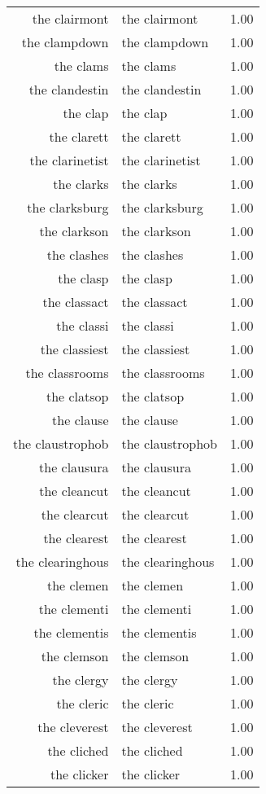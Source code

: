 \begin{table}[ht]
\begin{tabular}{rlr}
  the clairmont & the clairmont & 1.00 \\ 
  the clampdown & the clampdown & 1.00 \\ 
  the clams & the clams & 1.00 \\ 
  the clandestin & the clandestin & 1.00 \\ 
  the clap & the clap & 1.00 \\ 
  the clarett & the clarett & 1.00 \\ 
  the clarinetist & the clarinetist & 1.00 \\ 
  the clarks & the clarks & 1.00 \\ 
  the clarksburg & the clarksburg & 1.00 \\ 
  the clarkson & the clarkson & 1.00 \\ 
  the clashes & the clashes & 1.00 \\ 
  the clasp & the clasp & 1.00 \\ 
  the classact & the classact & 1.00 \\ 
  the classi & the classi & 1.00 \\ 
  the classiest & the classiest & 1.00 \\ 
  the classrooms & the classrooms & 1.00 \\ 
  the clatsop & the clatsop & 1.00 \\ 
  the clause & the clause & 1.00 \\ 
  the claustrophob & the claustrophob & 1.00 \\ 
  the clausura & the clausura & 1.00 \\ 
  the cleancut & the cleancut & 1.00 \\ 
  the clearcut & the clearcut & 1.00 \\ 
  the clearest & the clearest & 1.00 \\ 
  the clearinghous & the clearinghous & 1.00 \\ 
  the clemen & the clemen & 1.00 \\ 
  the clementi & the clementi & 1.00 \\ 
  the clementis & the clementis & 1.00 \\ 
  the clemson & the clemson & 1.00 \\ 
  the clergy & the clergy & 1.00 \\ 
  the cleric & the cleric & 1.00 \\ 
  the cleverest & the cleverest & 1.00 \\ 
  the cliched & the cliched & 1.00 \\ 
  the clicker & the clicker & 1.00 \\ 

\end{tabular}
\end{table}
